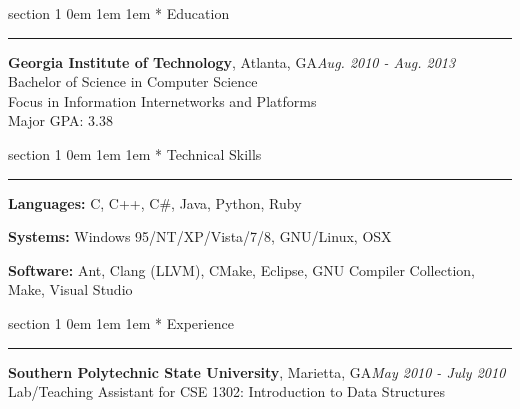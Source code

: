 \documentclass{article}
\makeatletter
\newcommand{\name}[1]{\def \@name {#1}}
\newcommand{\streetaddress}[1]{\def \@streetaddress {#1}}
\newcommand{\citystatezip}[1]{\def \@citystatezip {#1}}
\newcommand{\phone}[1]{\def \@phone {#1}}
\newcommand{\email}[1]{\def \@email {#1}}
\newcommand{\website}[1]{\def \@website {#1}}
\renewcommand{\section}[1]{
	\vspace{0.75em} %
	\@startsection
		{section}
		{1}
		{\z@}
		{0em}
		{1em \@minus 1em} %
		{\normalfont\large\sc\bfseries}
		*
		{#1}
	\vspace{-0.75em} %
	\hrule
	\vspace{0.25em} %
	\par
}
\newcommand{\entry}[1]{\def \@entry {#1}}
\newcommand{\dates}[1]{\def \@dates {#1}}
\newcommand{\location}[1]{\def \@location {#1}}
\newenvironment{locationentry}{
		\vspace{0.5em} %
		{\bf \@entry}, \@location \hfill {\it \@dates} \\
	}{}
\makeatother
\begin{document}
\name{Robert Kernan}
\phone{(770) 355-4050}
\streetaddress{16 Arbor Way Drive}
\citystatezip{Decatur, GA 30030}
\email{rkernan@gmail.com}
\website{robertkernan.com}

\maketitle

\thispagestyle{empty}

%
%

\section{Education}
\entry{Georgia Institute of Technology}
\location{Atlanta, GA}
\dates{Aug. 2010 - Aug. 2013}
\begin{locationentry}
Bachelor of Science in Computer Science \\
Focus in Information Internetworks and Platforms \\
Major GPA: 3.38 \\
\par
\end{locationentry}

\section{Technical Skills}
\vspace{0.5em}
{\bf Languages:}
C, C++, C\#, Java, Python, Ruby

\vspace{0.25em}
{\bf Systems:}
Windows 95/NT/XP/Vista/7/8, GNU/Linux, OSX

\vspace{0.25em}
{\bf Software:}
Ant, Clang (LLVM), CMake, Eclipse, GNU Compiler Collection, Make, Visual Studio

\section{Experience}
\entry{Southern Polytechnic State University}
\location{Marietta, GA}
\dates{May 2010 - July 2010}
\begin{locationentry}
 Lab/Teaching Assistant for CSE 1302: Introduction to Data Structures
\end{locationentry}
\end{document}
